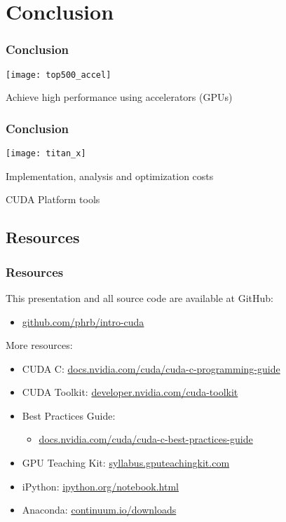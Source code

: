 \documentclass[10pt, compress]{beamer}
\begin{document}
\section{Conclusion}

\begin{frame}
    \frametitle{Conclusion}
    \centering
        \texttt{[image: top500\_accel]}
    \vfill

    Achieve \alert{high performance} using \alert{accelerators} \pause (\alert{GPUs})
\end{frame}

\begin{frame}
    \frametitle{Conclusion}
    \begin{center}
        \texttt{[image: titan\_x]}
    \end{center}
    \vfill

    \pause
    \alert{Implementation}, \alert{analysis} and \alert{optimization} costs

    \pause
    CUDA Platform \alert{tools}
\end{frame}

\subsection{Resources}

\begin{frame}
    \frametitle{Resources}
    This presentation and all source code are available
    at \alert{GitHub}:

    \begin{itemize}
        \item \url{github.com/phrb/intro-cuda}
    \end{itemize}

    More resources:

    \begin{itemize}
        \item CUDA C: \url{docs.nvidia.com/cuda/cuda-c-programming-guide}
        \item CUDA Toolkit: \url{developer.nvidia.com/cuda-toolkit}
        \item Best Practices Guide:
            \begin{itemize}
                \item \url{docs.nvidia.com/cuda/cuda-c-best-practices-guide}
            \end{itemize}
        \item GPU Teaching Kit: \url{syllabus.gputeachingkit.com}
        \item iPython: \url{ipython.org/notebook.html}
        \item Anaconda: \url{continuum.io/downloads}
    \end{itemize}
\end{frame}

\maketitle
\end{document}
